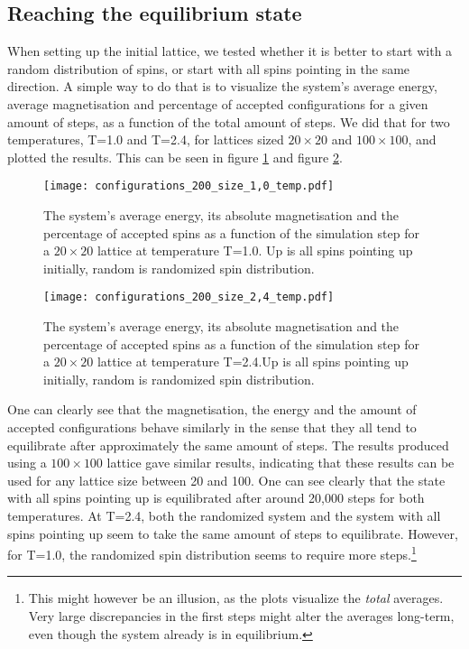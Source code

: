 \documentclass[10pt,a4paper]{article}
\begin{document}
\subsection{Reaching the equilibrium state}
When setting up the initial lattice, we tested whether it is better to start with a random distribution of spins, or start with all spins pointing in the same direction. A simple way to do that is to visualize the system's average energy, average magnetisation and percentage of accepted configurations for a given amount of steps, as a function of the total amount of steps. We did that for two temperatures, T=1.0 and T=2.4, for lattices sized $20\times20$ and $100\times 100$, and plotted the results. This can be seen in figure \ref{Average energy, average absolute magnetisation and accepted spins at T1.0} and figure \ref{Average energy, average absolute magnetisation and accepted spins at T2.4}.
\begin{figure}[H]
    \texttt{[image: configurations\_200\_size\_1,0\_temp.pdf]}
\caption[Average energy, average absolute magnetisation \& accepted spins at T=1.0]{The system's average energy, its absolute magnetisation and the percentage of accepted spins as a function of the simulation step for a $20\times20$ lattice at temperature T=1.0. Up is all spins pointing up initially, random is randomized spin distribution.}\label{Average energy, average absolute magnetisation and accepted spins at T1.0}
\end{figure}
\begin{figure}[H]
\texttt{[image: configurations\_200\_size\_2,4\_temp.pdf]}
\caption[Average energy, average absolute magnetisation \& accepted spins at T=2.4]{The system's average energy, its absolute magnetisation and the percentage of accepted spins as a function of the simulation step for a $20\times20$ lattice at temperature T=2.4.Up is all spins pointing up initially, random is randomized spin distribution.}\label{Average energy, average absolute magnetisation and accepted spins at T2.4}
\end{figure}
One can clearly see that the magnetisation, the energy and the amount of accepted configurations behave similarly in the sense that they all tend to equilibrate after approximately the same amount of steps.
The results produced using a $100\times100$ lattice gave similar results, indicating that these results can be used for any lattice size between 20 and 100. One can see clearly that the state with all spins pointing up is equilibrated after around 20,000 steps for both temperatures. At T=2.4, both the randomized system and the system with all spins pointing up seem to take the same amount of steps to equilibrate. However, for T=1.0, the randomized spin distribution seems to require more steps.\footnote{This might however be an illusion, as the plots visualize the \textit{total} averages. Very large discrepancies in the first steps might alter the averages long-term, even though the system already is in equilibrium.}\\
\end{document}
